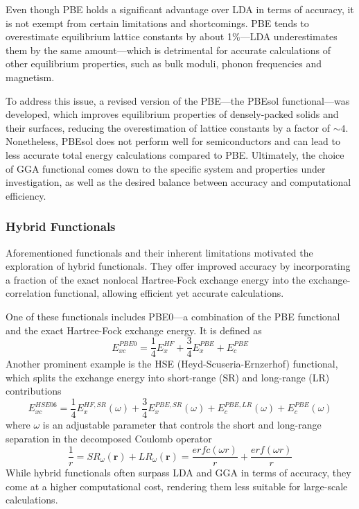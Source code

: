 Even though PBE holds a significant advantage over LDA in terms of accuracy, it is not exempt from certain limitations and shortcomings.  PBE tends to overestimate equilibrium lattice constants by about 1\%---LDA underestimates them by the same amount---which is detrimental for accurate calculations of other equilibrium properties, such as bulk moduli, phonon frequencies and magnetism.

To address this issue, a revised version of the PBE---the PBEsol functional\supercite{Perdew2008}---was developed, which improves equilibrium properties of densely-packed solids and their surfaces, reducing the overestimation of lattice constants by a factor of $\sim 4$. Nonetheless, PBEsol does not perform well for semiconductors and can lead to less accurate total energy calculations compared to PBE.  Ultimately, the choice of GGA functional comes down to the specific system and properties under investigation, as well as the desired balance between accuracy and computational efficiency.

\subsubsection{Hybrid Functionals}
Aforementioned functionals and their inherent limitations motivated the exploration of hybrid functionals. They offer improved accuracy by incorporating a fraction of the exact nonlocal Hartree-Fock exchange energy into the exchange-correlation functional, allowing efficient yet accurate calculations. 

One of these functionals includes PBE0\supercite{Heyd2003}---a combination of the PBE functional and the exact Hartree-Fock exchange energy. It is defined as 
\begin{equation}
  \label{eq66}
  E_{xc}^{PBE0} = \frac{1}{4}E_{x}^{HF} + \frac{3}{4}E_{x}^{PBE} + E_{c}^{PBE}
\end{equation}
Another prominent example is the HSE (Heyd-Scuseria-Ernzerhof) functional\supercite{Moussa2012}, which splits the exchange energy into short-range (SR) and long-range (LR) contributions
\begin{equation}
  \label{eq67}
  E_{xc}^{HSE06} = \frac{1}{4}E_{x}^{HF,SR}(\omega) + \frac{3}{4}E_{x}^{PBE,SR}(\omega) + E_{c}^{PBE,LR}(\omega) + E_{c}^{PBE}(\omega)
  \end{equation}
  where $\omega$ is an adjustable parameter that controls the short and long-range separation in the decomposed Coulomb operator
  \begin{equation}
    \label{eq68}
    \frac{1}{r} = SR_{\omega}(\mathbf{r}) + LR_{\omega}(\mathbf{r}) = 
    \frac{erfc(\omega r)}{r} + \frac{erf(\omega r)}{r}
  \end{equation}
  While hybrid functionals often surpass LDA and GGA in terms of accuracy, they come at a higher computational cost, rendering them less suitable for large-scale calculations.  
  

